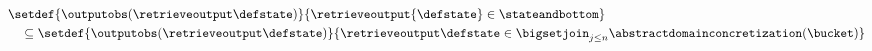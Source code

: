 \begin{align*}
& \setdef{\outputobs(\retrieveoutput\defstate)}{\retrieveoutput{\defstate} \in \stateandbottom} \\
&\quad \subseteq
\setdef{\outputobs(\retrieveoutput\defstate)}{\retrieveoutput\defstate\in\bigsetjoin_{j\le n}\abstractdomainconcretization(\bucket)}
\end{align*}
